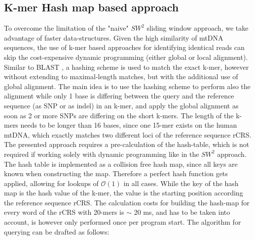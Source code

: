\subsection{K-mer Hash map based approach}
To overcome the limitation of the "naive" $SW^{2}$ sliding window approach, we take advantage of faster data-structures. Given the high similarity of mtDNA sequences, the use of k-mer based approaches for identifying identical reads can skip the cost-expensive dynamic programming (either global or local alignment). Similar to BLAST \cite{Altschul1990}, a hashing scheme is used to match the exact k-mer, however without extending to maximal-length matches, but with the additional use of global alignment. The main idea is to use the hashing scheme to perform also the alignment while only 1 base is differing between the query and the reference sequence (as SNP or as indel) in an k-mer, and apply the global alignment as soon as 2 or more SNPs are differing on the short k-mers. The length of the k-mers needs to be longer than 16 bases, since one 15-mer exists on the human mtDNA, which exactly matches two different loci of the reference sequence rCRS.
The presented approach requires a pre-calculation of the hash-table, which is not required if working solely with dynamic programming like in the $SW^{2}$ approach.
The hash table is implemented as a collision free hash map, since all keys are known when constructing the map. Therefore a perfect hash function gets applied, allowing for lookups of $\mathcal{O}(1)$ in all cases. While the key of the hash map is the hash value of the k-mer, the value is the starting position according the reference sequence rCRS. The calculation costs for building the hash-map for every word of the rCRS with 20-mers is $\sim$ 20 ms, and has to be taken into account, is however only performed once per program start.
The algorithm for querying can be drafted as follows:
